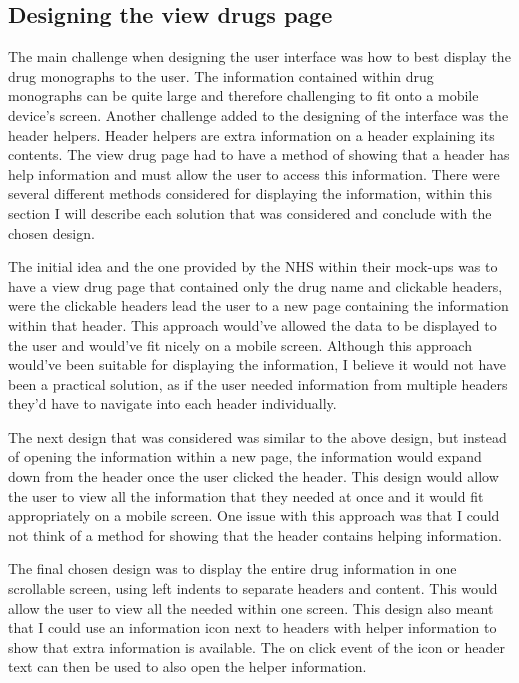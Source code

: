 \subsection{Designing the view drugs page}
The main challenge when designing the user interface was how to best display the drug monographs \cite{monograph} to the user. The information contained within drug monographs can be quite large and therefore challenging to fit onto a mobile device’s screen. Another challenge added to the designing of the interface was the header helpers. Header helpers are extra information on a header explaining its contents. The view drug page had to have a method of showing that a header has help information and must allow the user to access this information. There were several different methods considered for displaying the information, within this section I will describe each solution that was considered and conclude with the chosen design.

The initial idea and the one provided by the NHS within their mock-ups was to have a view drug page that contained only the drug name and clickable headers, were the clickable headers lead the user to a new page containing the information within that header. This approach would’ve allowed the data to be displayed to the user and would’ve fit nicely on a mobile screen. Although this approach would’ve been suitable for displaying the information, I believe it would not have been a practical solution, as if the user needed information from multiple headers they’d have to navigate into each header individually.

The next design that was considered was similar to the above design, but instead of opening the information within a new page, the information would expand down from the header once the user clicked the header. This design would allow the user to view all the information that they needed at once and it would fit appropriately on a mobile screen.  One issue with this approach was that I could not think of a method for showing that the header contains helping information.  

The final chosen design was to display the entire drug information in one scrollable screen, using left indents to separate headers and content. This would allow the user to view all the needed within one screen. This design also meant that I could use an information icon next to headers with helper information to show that extra information is available. The on click event of the icon or header text can then be used to also open the helper information.

